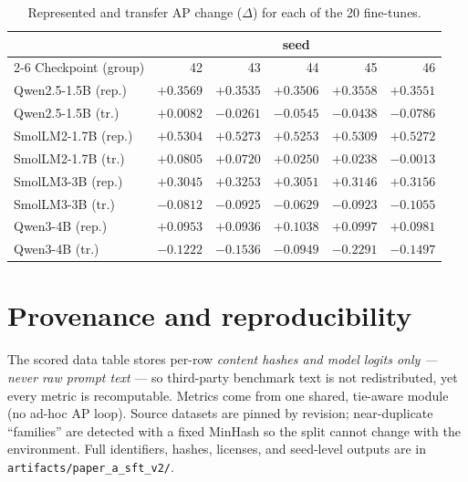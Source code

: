 \documentclass[11pt]{article}
\newcommand{\code}[1]{\texttt{\small #1}}
\begin{document}
\begin{table}[h]
\centering\small
\caption{Represented and transfer AP change ($\Delta$) for each of the 20 fine-tunes.}
\label{tab:seeds}
\begin{tabular}{l rrrrr}
\toprule
& \multicolumn{5}{c}{seed} \\
\cmidrule(lr){2-6}
Checkpoint (group) & 42 & 43 & 44 & 45 & 46 \\
\midrule
Qwen2.5-1.5B (rep.)  & $+0.3569$ & $+0.3535$ & $+0.3506$ & $+0.3558$ & $+0.3551$ \\
Qwen2.5-1.5B (tr.)   & $+0.0082$ & $-0.0261$ & $-0.0545$ & $-0.0438$ & $-0.0786$ \\
SmolLM2-1.7B (rep.)  & $+0.5304$ & $+0.5273$ & $+0.5253$ & $+0.5309$ & $+0.5272$ \\
SmolLM2-1.7B (tr.)   & $+0.0805$ & $+0.0720$ & $+0.0250$ & $+0.0238$ & $-0.0013$ \\
SmolLM3-3B (rep.)   & $+0.3045$ & $+0.3253$ & $+0.3051$ & $+0.3146$ & $+0.3156$ \\
SmolLM3-3B (tr.)    & $-0.0812$ & $-0.0925$ & $-0.0629$ & $-0.0923$ & $-0.1055$ \\
Qwen3-4B (rep.)    & $+0.0953$ & $+0.0936$ & $+0.1038$ & $+0.0997$ & $+0.0981$ \\
Qwen3-4B (tr.)     & $-0.1222$ & $-0.1536$ & $-0.0949$ & $-0.2291$ & $-0.1497$ \\
\bottomrule
\end{tabular}
\end{table}

\section{Provenance and reproducibility}
The scored data table stores per-row \emph{content hashes and model logits only --- never raw
prompt text} --- so third-party benchmark text is not redistributed, yet every metric is
recomputable. Metrics come from one shared, tie-aware module (no ad-hoc AP loop). Source
datasets are pinned by revision; near-duplicate ``families'' are detected with a fixed MinHash
so the split cannot change with the environment. Full identifiers, hashes, licenses, and
seed-level outputs are in \code{artifacts/paper\_a\_sft\_v2/}.
\end{document}
